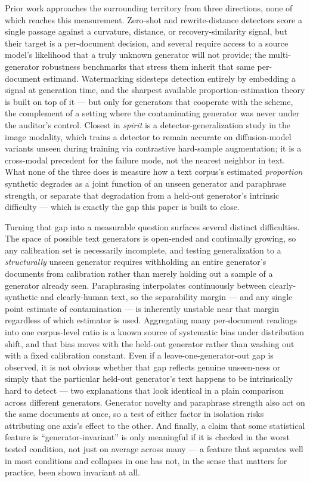 \documentclass[11pt]{article}
\begin{document}
Prior work approaches the surrounding territory from three directions, none of which reaches this measurement. Zero-shot and rewrite-distance detectors score a single passage against a curvature, distance, or recovery-similarity signal, but their target is a per-document decision, and several require access to a source model's likelihood that a truly unknown generator will not provide; the multi-generator robustness benchmarks that stress them inherit that same per-document estimand. Watermarking sidesteps detection entirely by embedding a signal at generation time, and the sharpest available proportion-estimation theory is built on top of it --- but only for generators that cooperate with the scheme, the complement of a setting where the contaminating generator was never under the auditor's control. Closest in \emph{spirit} is a detector-generalization study in the image modality, which trains a detector to remain accurate on diffusion-model variants unseen during training via contrastive hard-sample augmentation; it is a cross-modal precedent for the failure mode, not the nearest neighbor in text. What none of the three does is measure how a text corpus's estimated \emph{proportion} synthetic degrades as a joint function of an unseen generator and paraphrase strength, or separate that degradation from a held-out generator's intrinsic difficulty --- which is exactly the gap this paper is built to close.

Turning that gap into a measurable question surfaces several distinct difficulties. The space of possible text generators is open-ended and continually growing, so any calibration set is necessarily incomplete, and testing generalization to a \emph{structurally} unseen generator requires withholding an entire generator's documents from calibration rather than merely holding out a sample of a generator already seen. Paraphrasing interpolates continuously between clearly-synthetic and clearly-human text, so the separability margin --- and any single point estimate of contamination --- is inherently unstable near that margin regardless of which estimator is used. Aggregating many per-document readings into one corpus-level ratio is a known source of systematic bias under distribution shift, and that bias moves with the held-out generator rather than washing out with a fixed calibration constant. Even if a leave-one-generator-out gap is observed, it is not obvious whether that gap reflects genuine unseen-ness or simply that the particular held-out generator's text happens to be intrinsically hard to detect --- two explanations that look identical in a plain comparison across different generators. Generator novelty and paraphrase strength also act on the same documents at once, so a test of either factor in isolation risks attributing one axis's effect to the other. And finally, a claim that some statistical feature is ``generator-invariant'' is only meaningful if it is checked in the worst tested condition, not just on average across many --- a feature that separates well in most conditions and collapses in one has not, in the sense that matters for practice, been shown invariant at all.
\end{document}
